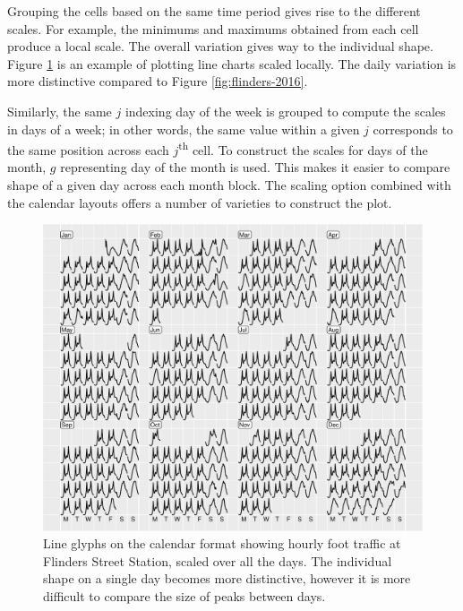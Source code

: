 \documentclass[article]{jss}
\theoremstyle{definition}
\theoremstyle{definition}
\theoremstyle{remark}
\begin{document}
Grouping the cells based on the same time period gives rise to the
different scales. For example, the minimums and maximums obtained from
each cell produce a local scale. The overall variation gives way to the
individual shape. Figure \ref{fig:flinders-free} is an example of
plotting line charts scaled locally. The daily variation is more
distinctive compared to Figure \ref{fig:flinders-2016}.

Similarly, the same \(j\) indexing day of the week is grouped to compute
the scales in days of a week; in other words, the same value within a
given \(j\) corresponds to the same position across each
\(j\)\textsuperscript{th} cell. To construct the scales for days of the
month, \(g\) representing day of the month is used. This makes it easier
to compare shape of a given day across each month block. The scaling
option combined with the calendar layouts offers a number of varieties
to construct the plot.

\begin{CodeChunk}
\begin{figure}

{\centering \includegraphics[width=\textwidth]{figure/flinders-free-1} 

}

\caption[Line glyphs on the calendar format showing
hourly foot traffic at Flinders Street Station, scaled over all the
days. The individual shape on a single day becomes more distinctive,
however it is more difficult to compare the size of peaks between days.]{Line glyphs on the calendar format showing
hourly foot traffic at Flinders Street Station, scaled over all the
days. The individual shape on a single day becomes more distinctive,
however it is more difficult to compare the size of peaks between days.}\label{fig:flinders-free}
\end{figure}
\end{CodeChunk}
\end{document}

